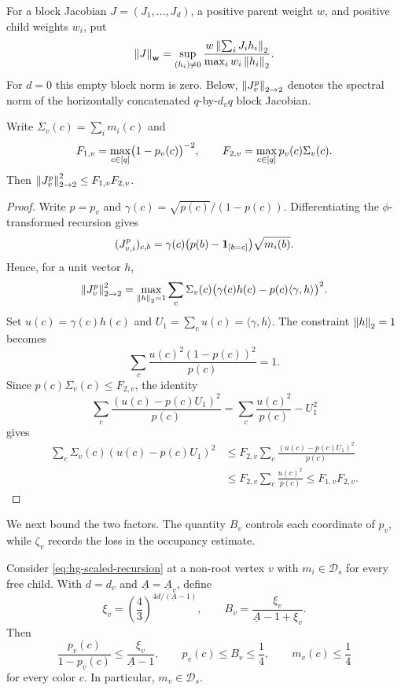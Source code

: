 For a block Jacobian \(J=(J_1,\ldots,J_d)\), a positive parent weight
\(w\), and positive child weights \(w_i\), put
\begin{equation}
 \left\|J\right\|_{\mathbf w}
 =\sup_{(h_i)\ne0}
   \frac{w\left\|\sum_iJ_ih_i\right\|_2}
        {\max_i w_i\left\|h_i\right\|_2}.
 \label{eq:hg-weighted-norm}
\end{equation}
For \(d=0\) this empty block norm is zero.
Below, \(\left\|J^p_v\right\|_{2\to2}\) denotes the spectral norm of the horizontally
concatenated \(q\)-by-\(d_vq\) block Jacobian.

\begin{lemma}\label{lem:hg-jacobian-factor}
Write \(\Sigma_v(c)=\sum_i m_i(c)\) and
\[
  F_{1,v}=\max_{c\in[q]}\bigl(1-p_v(c)\bigr)^{-2},
  \qquad
  F_{2,v}=\max_{c\in[q]}p_v(c)\Sigma_v(c).
\]
Then \(\left\|J^p_v\right\|_{2\to2}^2\le F_{1,v}F_{2,v}\).
\end{lemma}

\begin{proof}
Write \(p=p_v\) and \(\gamma(c)=\sqrt{p(c)}/(1-p(c))\).
Differentiating the \(\phi\)-transformed recursion gives
\[
  (J^p_{v,i})_{c,b}
   =\gamma(c)\bigl(p(b)-\mathbf{1}_{\left[b=c\right]}\bigr)\sqrt{m_i(b)}.
\]
Hence, for a unit vector \(h\),
\[
  \left\|J^p_v\right\|_{2\to2}^2
   =\max_{\left\|h\right\|_2=1}\sum_c\Sigma_v(c)
      \bigl(\gamma(c)h(c)-p(c)\langle\gamma,h\rangle\bigr)^2 .
\]
Set \(u(c)=\gamma(c)h(c)\) and
\(U_1=\sum_cu(c)=\langle\gamma,h\rangle\).  The constraint
\(\left\|h\right\|_2=1\) becomes
\[
  \sum_c\frac{u(c)^2(1-p(c))^2}{p(c)}=1.
\]
Since \(p(c)\Sigma_v(c)\le F_{2,v}\), the identity
\[
  \sum_c\frac{(u(c)-p(c)U_1)^2}{p(c)}
  =\sum_c\frac{u(c)^2}{p(c)}-U_1^2
\]
gives
\[
\begin{aligned}
 \sum_c\Sigma_v(c)(u(c)-p(c)U_1)^2
 &\le F_{2,v}\sum_c\frac{(u(c)-p(c)U_1)^2}{p(c)}\\
 &\le F_{2,v}\sum_c\frac{u(c)^2}{p(c)}
 \le F_{1,v}F_{2,v}.
\end{aligned}
\]
\end{proof}

We next bound the two factors.  The quantity \(B_v\) controls each
coordinate of \(p_v\), while \(\zeta_v\) records the loss in the occupancy
estimate.

\begin{lemma}
\label{lem:hg-continuous-marginal}
Consider \eqref{eq:hg-scaled-recursion} at a non-root vertex \(v\) with
$m_i\in\mathcal D_s$ for every free child.  With $d=d_v$ and
\(\underline A=\underline A_v\), define
\begin{equation}
  \xi_v=\left(\frac43\right)^{4d/(\underline A-1)},
  \qquad
  B_v=\frac{\xi_v}{\underline A-1+\xi_v}.
  \label{eq:hg-xi-B}
\end{equation}
Then
\begin{equation}
  \frac{p_v(c)}{1-p_v(c)}
    \le\frac{\xi_v}{\underline A-1},
  \qquad p_v(c)\le B_v\le\frac14,
  \qquad m_v(c)\le\frac14
  \label{eq:hg-marginal-bound}
\end{equation}
for every color $c$.  In particular,
\(m_v\in\mathcal D_s\).
\end{lemma}

